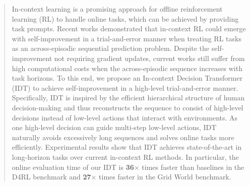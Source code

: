 \begin{abstract}
In-context learning is a promising approach for offline reinforcement learning (RL) to handle online tasks, which can be achieved by providing task prompts. Recent works demonstrated that in-context RL could emerge with self-improvement in a trial-and-error manner when treating RL tasks as an across-episodic sequential prediction problem. Despite the self-improvement not requiring gradient updates, current works still suffer from high computational costs when the across-episodic sequence increases with task horizons. To this end, we propose an In-context Decision Transformer (IDT) to achieve self-improvement in a high-level trial-and-error manner. Specifically, IDT is inspired by the efficient hierarchical structure of human decision-making and thus reconstructs the sequence to consist of high-level decisions instead of low-level actions that interact with environments. As one high-level decision can guide multi-step low-level actions, IDT naturally avoids excessively long sequences and solves online tasks more efficiently. Experimental results show that IDT achieves state-of-the-art in long-horizon tasks over current in-context RL methods. In particular, the online evaluation time of our IDT is \textbf{36$\bm\times$} times faster than baselines in the D4RL benchmark and \textbf{27$\bm\times$} times faster in the Grid World benchmark.
\end{abstract}


